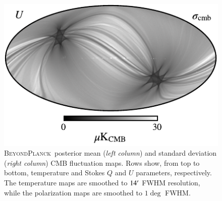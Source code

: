 \documentclass[twocolumn]{aa}
\newcommand{\BP}{\textsc{BeyondPlanck}}
\begin{document}
\begin{figure}[t]
  \includegraphics[width=0.49\linewidth]{figs/BP_cmb_v2_U_STDDEV_w8_n1024_cb_c-neutral.pdf}  
  \caption{\BP\ posterior mean (\emph{left column}) and standard
    deviation (\emph{right column}) CMB fluctuation maps. Rows show,
    from top to bottom, temperature and Stokes $Q$ and $U$ parameters,
    respectively. The temperature maps are smoothed to $14\arcm$ FWHM
    resolution, while the polarization maps are smoothed to $1\deg$
    FWHM. }\label{fig:cmb_BP}
\end{figure}
\end{document}
